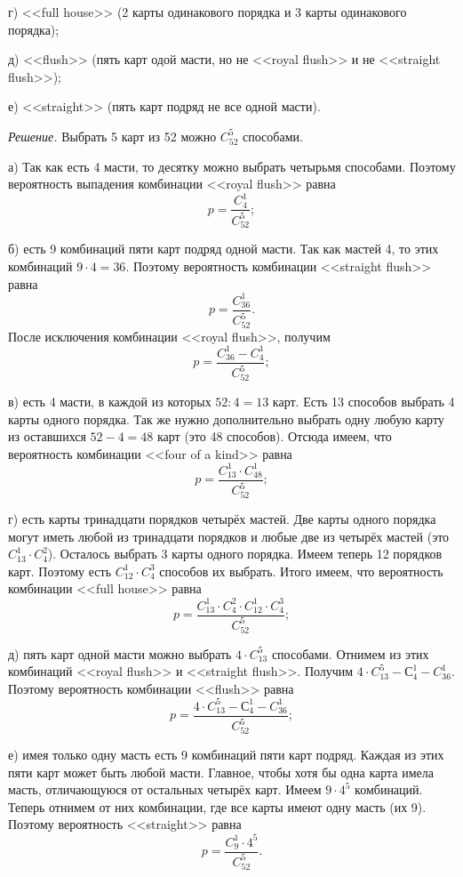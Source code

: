 \documentclass{book}
\begin{document}
г) <<full house>> (2 карты одинакового порядка и 3 карты одинакового порядка);

д) <<flush>> (пять карт одой масти, но не <<royal flush>> и не <<straight flush>>);

е) <<straight>> (пять карт подряд не все одной масти).

\textit{Решение.} Выбрать 5 карт из 52 можно $ C_{52}^5 $ способами.

а) Так как есть 4 масти, то десятку можно выбрать четырьмя способами.
Поэтому вероятность выпадения комбинации <<royal flush>> равна
$$ p =
\frac{ C_4^1 }{ C_{52}^5 };$$

б) есть 9 комбинаций пяти карт подряд одной масти.
Так как мастей 4, то этих комбинаций $ 9 \cdot 4 = 36 $.
Поэтому вероятность комбинации <<straight flush>> равна
$$ p =
\frac{ C_{36}^1 }{ C_{52}^5 }.$$
После исключения комбинации <<royal flush>>, получим
$$ p =
\frac{ C_{36}^1 - C_4^1 }{ C_{52}^5 };$$

в) есть 4 масти, в каждой из которых $ 52 : 4 = 13 $ карт.
Есть 13 способов выбрать 4 карты одного порядка.
Так же нужно дополнительно выбрать одну любую карту из оставшихся $ 52 - 4 = 48 $ карт (это 48 способов).
Отсюда имеем, что вероятность комбинации <<four of a kind>> равна
$$ p =
\frac{ C_{13}^1 \cdot C_{48}^1 }{ C_{52}^5 };$$

г) есть карты тринадцати порядков четырёх мастей.
Две карты одного порядка могут иметь любой из тринадцати порядков и любые две из четырёх мастей (это $ C_{13}^1 \cdot C_4^2 $).
Осталось выбрать 3 карты одного порядка. Имеем теперь 12 порядков карт.
Поэтому есть $ C_{12}^1 \cdot C_4^3 $ способов их выбрать.
Итого имеем, что вероятность комбинации <<full house>> равна
$$ p =
\frac{ C_{13}^1 \cdot C_4^2 \cdot C_{12}^1 \cdot C_4^3 }{ C_{52}^5 };$$

д) пять карт одной масти можно выбрать $ 4 \cdot C_{13}^5 $ способами.
Отнимем из этих комбинаций <<royal flush>> и <<straight flush>>.
Получим $ 4 \cdot C_{13}^5 - С_4^1 - C_{36}^1 $.
Поэтому вероятность комбинации <<flush>> равна
$$ p =
\frac{ 4 \cdot C_{13}^5 - С_4^1 - C_{36}^1 }{ C_{52}^5 };$$

е) имея только одну масть есть 9 комбинаций пяти карт подряд.
Каждая из этих пяти карт может быть любой масти.
Главное, чтобы хотя бы одна карта имела масть, отличающуюся от остальных четырёх карт.
Имеем $ 9 \cdot 4^5 $ комбинаций.
Теперь отнимем от них комбинации, где все карты имеют одну масть (их 9).
Поэтому вероятность <<straight>> равна
$$ p =
\frac{ C_9^1 \cdot 4^5 }{ C_{52}^5 }.$$
\end{document}
